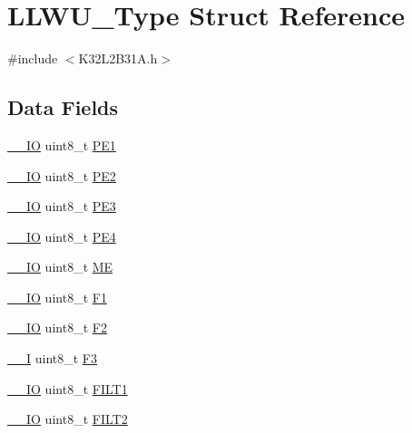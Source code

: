 \hypertarget{struct_l_l_w_u___type}{}\section{L\+L\+W\+U\+\_\+\+Type Struct Reference}
\label{struct_l_l_w_u___type}


{\ttfamily \#include $<$K32\+L2\+B31\+A.\+h$>$}

\subsection*{Data Fields}
\begin{DoxyCompactItemize}
\item 
\mbox{\hyperlink{core__cm0plus_8h_aec43007d9998a0a0e01faede4133d6be}{\+\_\+\+\_\+\+IO}} uint8\+\_\+t \mbox{\hyperlink{struct_l_l_w_u___type_aa97f1aae59ce6efd1a22b9ca279058f0}{P\+E1}}
\item 
\mbox{\hyperlink{core__cm0plus_8h_aec43007d9998a0a0e01faede4133d6be}{\+\_\+\+\_\+\+IO}} uint8\+\_\+t \mbox{\hyperlink{struct_l_l_w_u___type_a995e13620d64851a128d6d2e03b6713e}{P\+E2}}
\item 
\mbox{\hyperlink{core__cm0plus_8h_aec43007d9998a0a0e01faede4133d6be}{\+\_\+\+\_\+\+IO}} uint8\+\_\+t \mbox{\hyperlink{struct_l_l_w_u___type_ae66b179d39862bb7d0f8ba9b4c2c58a8}{P\+E3}}
\item 
\mbox{\hyperlink{core__cm0plus_8h_aec43007d9998a0a0e01faede4133d6be}{\+\_\+\+\_\+\+IO}} uint8\+\_\+t \mbox{\hyperlink{struct_l_l_w_u___type_a7c081e6d23713bc4eec0ab17965a8dff}{P\+E4}}
\item 
\mbox{\hyperlink{core__cm0plus_8h_aec43007d9998a0a0e01faede4133d6be}{\+\_\+\+\_\+\+IO}} uint8\+\_\+t \mbox{\hyperlink{struct_l_l_w_u___type_aaafdc4eddd9d9e84f3175cf74e29f1b0}{ME}}
\item 
\mbox{\hyperlink{core__cm0plus_8h_aec43007d9998a0a0e01faede4133d6be}{\+\_\+\+\_\+\+IO}} uint8\+\_\+t \mbox{\hyperlink{struct_l_l_w_u___type_a07810538c8d6aba73ee3dd0c573256c7}{F1}}
\item 
\mbox{\hyperlink{core__cm0plus_8h_aec43007d9998a0a0e01faede4133d6be}{\+\_\+\+\_\+\+IO}} uint8\+\_\+t \mbox{\hyperlink{struct_l_l_w_u___type_a8390d51184687794c312ac5148cc9e2b}{F2}}
\item 
\mbox{\hyperlink{core__cm0plus_8h_af63697ed9952cc71e1225efe205f6cd3}{\+\_\+\+\_\+I}} uint8\+\_\+t \mbox{\hyperlink{struct_l_l_w_u___type_a9830952a98862ed103ad0cff61b77bb5}{F3}}
\item 
\mbox{\hyperlink{core__cm0plus_8h_aec43007d9998a0a0e01faede4133d6be}{\+\_\+\+\_\+\+IO}} uint8\+\_\+t \mbox{\hyperlink{struct_l_l_w_u___type_afbd6f1eb8283eca63c4ea3c3d657f149}{F\+I\+L\+T1}}
\item 
\mbox{\hyperlink{core__cm0plus_8h_aec43007d9998a0a0e01faede4133d6be}{\+\_\+\+\_\+\+IO}} uint8\+\_\+t \mbox{\hyperlink{struct_l_l_w_u___type_a5704aaa9940312ccd60ee44f31932094}{F\+I\+L\+T2}}
\end{DoxyCompactItemize}


